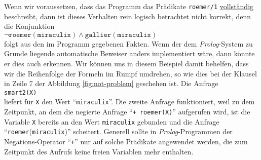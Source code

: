Wenn wir voraussetzen, dass das Programm das Prädikate \texttt{roemer/1}
\underline{vollständi}g beschreibt, dann ist dieses Verhalten rein logisch betrachtet nicht korrekt,
denn die Konjunktion \\[0.1cm]
\hspace*{1.3cm} 
$\neg \mathtt{roemer}(\mathtt{miraculix}) \wedge \mathtt{gallier}(\mathtt{miraculix})$
 \\[0.1cm]
folgt aus den im Programm gegebenen Fakten.  Wenn der dem \textsl{Prolog}-System zu Grunde liegende
automatische Beweiser anders implementiert wäre, dann könnte er dies auch erkennen.
Wir können uns in diesem Beispiel damit behelfen, dass wir die Reihenfolge der
Formeln im Rumpf umdrehen, so wie dies bei der Klausel in Zeile 7 der Abbildung
\ref{fig:not-problem} geschehen ist.  Die Anfrage \\[0.1cm]
\hspace*{1.3cm} \texttt{smart2(X)} \\[0.1cm]
liefert für \texttt{X} den Wert ``\texttt{miraculix}''.
Die zweite Anfrage funktioniert, weil zu dem Zeitpunkt, an dem die negierte Anfrage
``\texttt{+ roemer(X)}'' aufgerufen wird, ist die Variable \texttt{X} bereits
an den Wert \texttt{miraculix} gebunden und die Anfrage ``\texttt{roemer}(\texttt{miraculix})''
scheitert.  Generell sollte in \textsl{Prolog}-Programmen der Negations-Operator
``\texttt{+}'' nur auf solche Prädikate angewendet werden, die zum Zeitpunkt
des Aufrufs keine freien Variablen mehr enthalten.

